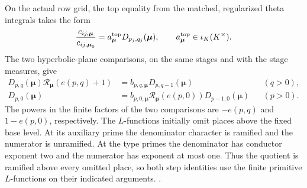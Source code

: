 On the actual row grid, the top equality from the matched,
regularized theta integrals takes the form
\[
  \frac{c_{ij,\boldsymbol\mu}}{c_{ij,\boldsymbol\mu_0}}
     = a^{\rm top}_{\boldsymbol\mu}D_{p_j,q_j}(\boldsymbol\mu),
  \qquad a^{\rm top}_{\boldsymbol\mu}\in\iota_K(K^\times).
\]
The two hyperbolic-plane comparisons, on the same stages and with
the stage measures, give
\begin{align*}
 D_{p,q}(\boldsymbol\mu)\mathcal R_{\boldsymbol\mu}(e(p,q)+1)
      &= b_{p,q,\boldsymbol\mu}D_{p,q-1}(\boldsymbol\mu) &&(q>0),\\
 D_{p,0}(\boldsymbol\mu)
      &= b_{p,0,\boldsymbol\mu}\mathcal R_{\boldsymbol\mu}(e(p,0))
                    D_{p-1,0}(\boldsymbol\mu) &&(p>0).
\end{align*}
The powers in the finite factors of the two comparisons are
\(-e(p,q)\) and \(1-e(p,0)\), respectively. The \(L\)-functions
initially omit places above the fixed base level. At its auxiliary
prime the denominator character is ramified and the numerator is
unramified. At the type primes the denominator has conductor exponent
two and the numerator has exponent at most one. Thus the quotient
is ramified above every omitted place, so both step identities use
the finite primitive \(L\)-functions on their indicated arguments.
.

